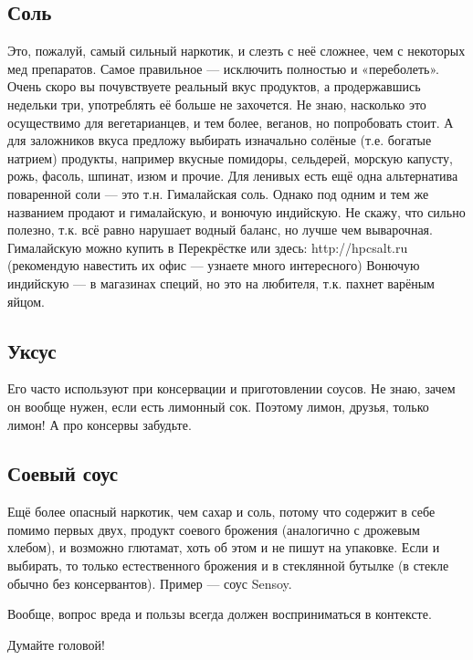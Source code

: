 \subsection{Соль}\label{salt}

Это, пожалуй, самый сильный наркотик, и слезть с неё сложнее, чем с некоторых мед препаратов. Самое правильное — исключить полностью и «переболеть». Очень скоро вы почувствуете реальный вкус продуктов, а продержавшись недельки три, употреблять её больше не захочется. Не знаю, насколько это осуществимо для вегетарианцев, и тем более, веганов, но попробовать стоит.
А для заложников вкуса предложу выбирать изначально солёные (т.е. богатые натрием) продукты, например вкусные помидоры, сельдерей, морскую капусту, рожь, фасоль, шпинат, изюм и прочие.
Для ленивых есть ещё одна альтернатива поваренной соли — это т.н. Гималайская соль. Однако под одним и тем же названием продают и гималайскую, и вонючую индийскую. Не скажу, что сильно полезно, т.к. всё равно нарушает водный баланс, но лучше чем выварочная.
Гималайскую можно купить в Перекрёстке или здесь: http://hpcsalt.ru (рекомендую навестить их офис — узнаете много интересного)
Вонючую индийскую — в магазинах специй, но это на любителя, т.к. пахнет варёным яйцом.

\subsection{Уксус}\label{vinegar}

Его часто используют при консервации и приготовлении соусов. Не знаю, зачем он вообще нужен, если есть лимонный сок. Поэтому лимон, друзья, только лимон! А про консервы забудьте.

\subsection{Соевый соус}\label{soy}

Ещё более опасный наркотик, чем сахар и соль, потому что содержит в себе помимо первых двух, продукт соевого брожения (аналогично с дрожевым хлебом), и возможно глютамат, хоть об этом и не пишут на упаковке. Если и выбирать, то только естественного брожения и в стеклянной бутылке (в стекле обычно без консервантов). Пример — соус Sensoy.

Вообще, вопрос вреда и пользы всегда должен восприниматься в контексте. 

Думайте головой!

